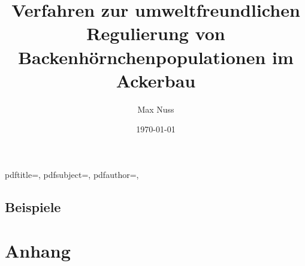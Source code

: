 

\subject{Bachelor-Thesis}
\title{Verfahren zur umweltfreundlichen Regulierung von Backenhörnchenpopulationen im Ackerbau}
\author{Max Nuss}
\publishers{Hochschule Mannheim, Fakultät für \dots}
\date{\today}

\makeatletter
\hypersetup
{
	pdftitle={\@title},
	pdfsubject={\@subject},
	pdfauthor={\@author, \@publishers}
}
\makeatother



	


		
		
		

		\clearpage
		
		\clearpage


	

	\chapter{Beispiele}

		
		
		
		

	\appendix\part*{Anhang}

	
	
	
	
	


